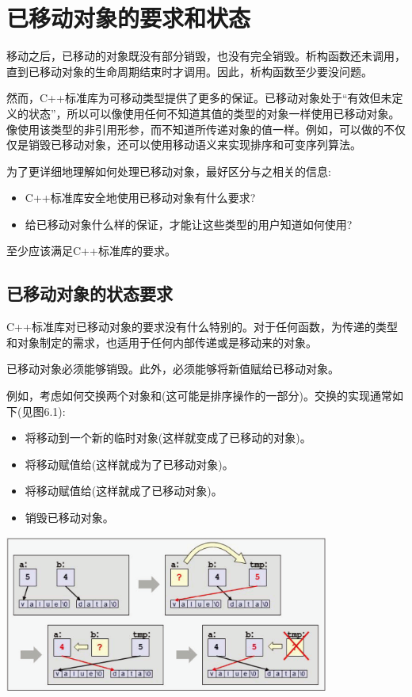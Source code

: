 \section{已移动对象的要求和状态}
移动之后，已移动的对象既没有部分销毁，也没有完全销毁。析构函数还未调用，直到已移动对象的生命周期结束时才调用。因此，析构函数至少要没问题。

然而，C++标准库为可移动类型提供了更多的保证。已移动对象处于“有效但未定义的状态”，所以可以像使用任何不知道其值的类型的对象一样使用已移动对象。像使用该类型的非引用形参，而不知道所传递对象的值一样。例如，可以做的不仅仅是销毁已移动对象，还可以使用移动语义来实现排序和可变序列算法。

为了更详细地理解如何处理已移动对象，最好区分与之相关的信息:

\begin{itemize}
	\item C++标准库安全地使用已移动对象有什么要求?
	\item 给已移动对象什么样的保证，才能让这些类型的用户知道如何使用?
\end{itemize}

至少应该满足C++标准库的要求。

\subsection{已移动对象的状态要求}

C++标准库对已移动对象的要求没有什么特别的。对于任何函数，为传递的类型和对象制定的需求，也适用于任何内部传递或是移动来的对象。

已移动对象必须能够销毁。此外，必须能够将新值赋给已移动对象。

例如，考虑如何交换两个对象和(这可能是排序操作的一部分)。交换的实现通常如下(见图6.1):

\begin{itemize}
	\item 将移动到一个新的临时对象(这样就变成了已移动的对象)。
	\item 将移动赋值给(这样就成为了已移动对象)。
	\item 将移动赋值给(这样就成了已移动对象)。
	\item 销毁已移动对象。
\end{itemize}

\begin{center}
	\includegraphics[width=0.8\textwidth]{part1/ch6/images/1}
\end{center}

